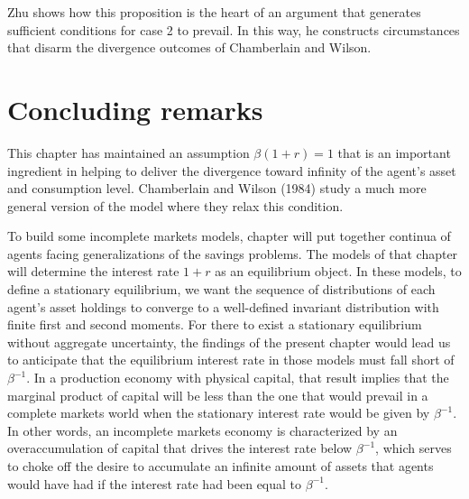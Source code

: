 \noindent Zhu shows how this proposition is the heart of an argument that generates sufficient conditions for case 2 to prevail. In this way,
he constructs circumstances that disarm the divergence outcomes of Chamberlain and Wilson.
%
%
%


\section{Concluding remarks}

  This chapter has maintained an assumption $\beta (1+r) =1$ that 
  is an  important ingredient in helping to  deliver the divergence
toward infinity of the agent's asset and consumption level.
  Chamberlain and Wilson (1984)
study a much more general version of the model where they relax this condition.
 

To build
some incomplete markets models, chapter  will put together continua of agents
facing generalizations of the savings problems.  The models of that chapter will
determine the interest rate $1+r$ as an equilibrium object. In
these models, to define a stationary equilibrium, we want the
sequence of distributions of each agent's asset holdings to
converge to a well-defined invariant distribution with finite
first and second moments.  For there to exist a stationary
equilibrium without aggregate uncertainty, the findings of the
present chapter would lead us to anticipate that the equilibrium
interest rate in those models must fall short of $\beta^{-1}$. In
a production economy with physical capital, that result implies
that the marginal product of capital will be less than the one
that would prevail in a complete markets world when the stationary
interest rate would be given by $\beta^{-1}$. In other words, an
incomplete markets economy is characterized by an overaccumulation
of capital that drives the interest rate below $\beta^{-1}$, which
serves to choke off  the desire to accumulate an infinite amount of
assets that agents would have had  if the interest rate had been equal
to $\beta^{-1}$.

